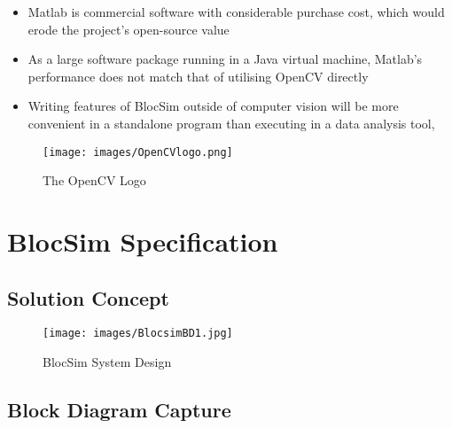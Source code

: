\begin{itemize}
\item Matlab is commercial software with considerable purchase cost, which would erode the project's open-source value
\item As a large software package running in a Java virtual machine, Matlab's performance does not match that of utilising OpenCV directly
\item Writing features of BlocSim outside of computer vision will be more convenient in a standalone program than executing in a data analysis tool,
\end{itemize}

\begin{figure}[ht!]
\centering
\texttt{[image: images/OpenCVlogo.png]}
\caption{The OpenCV Logo \cite{opencv}}
\label{im:cvlogo}
\end{figure}








\chapter{BlocSim Specification}
\label{ch:spec}



\section{Solution Concept}

\begin{figure}[ht!]
\centering
\texttt{[image: images/BlocsimBD1.jpg]}
\caption{BlocSim System Design \cite{blocsimPoster}}
\label{im:BlocsimBD1}
\end{figure}

\clearpage



\section{Block Diagram Capture}



